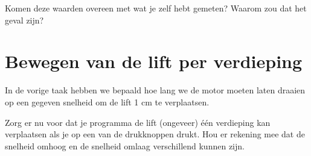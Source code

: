 \documentclass[a4paper, 10pt]{article}
\begin{document}
Komen deze waarden overeen met wat je zelf hebt gemeten? Waarom zou dat het geval zijn?

\section{Bewegen van de lift per verdieping}

In de vorige taak hebben we bepaald hoe lang we de motor moeten laten draaien op een gegeven snelheid om de lift 1 cm te
verplaatsen.

Zorg er nu voor dat je programma de lift (ongeveer) \'e\'en verdieping kan verplaatsen als je op een van de
drukknoppen drukt. Hou er rekening mee dat de snelheid omhoog en de snelheid omlaag verschillend kunnen zijn.
\end{document}
